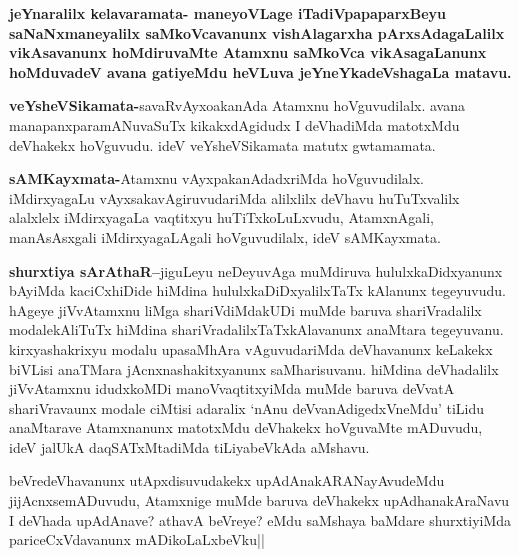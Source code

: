 \begin{artha}
\textbf{jeYnaralilx kelavaramata- maneyoVLage iTadiVpapaparxBeyu saNaNxmaneyalilx saMkoVcavanunx vishAlagarxha pArxsAdagaLalilx vikAsavanunx hoMdiruvaMte Atamxnu saMkoVca vikAsagaLanunx hoMduvadeV avana gatiyeMdu heVLuva jeYneYkadeVshagaLa matavu.}
\end{artha}

\begin{artha}
\textbf{veYsheVSikamata-}savaRvAyxoakanAda Atamxnu hoVguvudilalx. avana manapanxparamANuvaSuTx kikakxdAgidudx I deVhadiMda matotxMdu deVhakekx hoVguvudu. ideV veYsheVSikamata matutx gwtamamata.
\end{artha}

\begin{artha}
\textbf{sAMKayxmata-}Atamxnu vAyxpakanAdadxriMda hoVguvudilalx. iMdirxyagaLu vAyxsakavAgiruvudariMda alilxlilx deVhavu huTuTxvalilx alalxlelx iMdirxyagaLa vaqtitxyu huTiTxkoLuLxvudu, AtamxnAgali, manAsAsxgali iMdirxyagaLAgali hoVguvudilalx, ideV sAMKayxmata.
\end{artha}


\begin{artha}
\textbf{shurxtiya sArAthaR--}jiguLeyu neDeyuvAga muMdiruva hululxkaDidxyanunx bAyiMda kaciCxhiDide hiMdina hululxkaDiDxyalilxTaTx kAlanunx tegeyuvudu. hAgeye jiVvAtamxnu liMga shariVdiMdakUDi muMde baruva shariVradalilx modalekAliTuTx hiMdina shariVradalilxTaTxkAlavanunx anaMtara tegeyuvanu. kirxyashakrixyu modalu upasaMhAra vAguvudariMda deVhavanunx keLakekx biVLisi anaTMara jAcnxnashakitxyanunx saMharisuvanu. hiMdina deVhadalilx jiVvAtamxnu idudxkoMDi manoVvaqtitxyiMda muMde baruva deVvatA shariVravaunx modale ciMtisi adaralix  `nAnu deVvanAdigedxVneMdu' tiLidu anaMtarave Atamxnanunx matotxMdu deVhakekx hoVguvaMte mADuvudu, ideV jalUkA daqSATxMtadiMda tiLiyabeVkAda aMshavu.
\end{artha}

\begin{artha}
beVredeVhavanunx utApxdisuvudakekx upAdAnakARANayAvudeMdu jijAcnxsemADuvudu, Atamxnige muMde baruva deVhakekx upAdhanakAraNavu I deVhada upAdAnave? athavA beVreye? eMdu saMshaya baMdare shurxtiyiMda pariceCxVdavanunx mADikoLaLxbeVku||
\end{artha}

